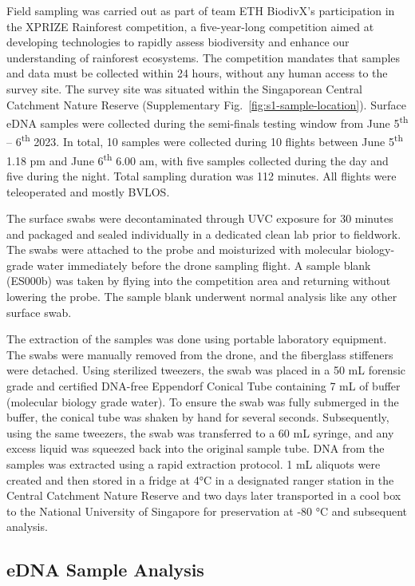 Field sampling was carried out as part of team ETH BiodivX’s participation in the XPRIZE Rainforest competition, a five-year-long competition aimed at developing technologies to rapidly assess biodiversity and enhance our understanding of rainforest ecosystems. The competition mandates that samples and data must be collected within 24 hours, without any human access to the survey site. The survey site was situated within the Singaporean Central Catchment Nature Reserve (Supplementary Fig.~\ref{fig:s1-sample-location}). Surface \gls{eDNA} samples were collected during the semi-finals testing window from June 5\textsuperscript{th} – 6\textsuperscript{th} 2023. In total, 10 samples were collected during 10 flights between June 5\textsuperscript{th} 1.18 pm and June 6\textsuperscript{th} 6.00 am, with five samples collected during the day and five during the night. Total sampling duration was 112 minutes. All flights were teleoperated and mostly \gls{BVLOS}.

The surface swabs were decontaminated through UVC exposure for 30 minutes and packaged and sealed individually in a dedicated clean lab prior to fieldwork. The swabs were attached to the probe and moisturized with molecular biology-grade water immediately before the drone sampling flight. A sample blank (ES000b) was taken by flying into the competition area and returning without lowering the probe. The sample blank underwent normal analysis like any other surface swab.

The extraction of the samples was done using portable laboratory equipment. The swabs were manually removed from the drone, and the fiberglass stiffeners were detached. Using sterilized tweezers, the swab was placed in a 50 mL forensic grade and certified DNA-free Eppendorf Conical Tube containing 7 mL of buffer (molecular biology grade water). To ensure the swab was fully submerged in the buffer, the conical tube was shaken by hand for several seconds. Subsequently, using the same tweezers, the swab was transferred to a 60 mL syringe, and any excess liquid was squeezed back into the original sample tube. DNA from the samples was extracted using a rapid extraction protocol. 1 mL aliquots were created and then stored in a fridge at 4°C in a designated ranger station in the Central Catchment Nature Reserve and two days later transported in a cool box to the National University of Singapore for preservation at -80 °C and subsequent analysis.

\subsection{eDNA Sample Analysis}
\label{sec:methods-edna}

